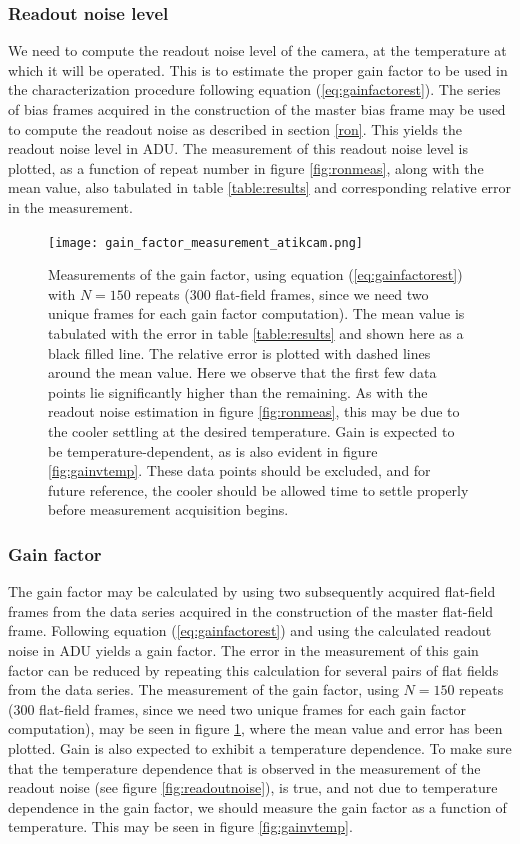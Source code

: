\documentclass[../main.tex]{subfiles}
\begin{document}
		\subsubsection{Readout noise level}
		We need to compute the readout noise level of the camera, at the temperature at which it will be operated. This is to estimate the proper gain factor to be used in the characterization procedure following equation (\ref{eq:gainfactorest}). The series of bias frames acquired in the construction of the master bias frame may be used to compute the readout noise as described in section \ref{ron}. This yields the readout noise level in ADU. The measurement of this readout noise level is plotted, as a function of repeat number in figure \ref{fig:ronmeas}, along with the mean value, also tabulated in table \ref{table:results} and corresponding relative error in the measurement.
		\begin{figure}[h!]
			\centering
			\texttt{[image: gain\_factor\_measurement\_atikcam.png]}
			\caption{Measurements of the gain factor, using equation (\ref{eq:gainfactorest}) with $N=150$ repeats ($300$ flat-field frames, since we need two unique frames for each gain factor computation). The mean value is tabulated with the error in table \ref{table:results} and shown here as a black filled line. The relative error is plotted with dashed lines around the mean value. Here we observe that the first few data points lie significantly higher than the remaining. As with the readout noise estimation in figure \ref{fig:ronmeas}, this may be due to the cooler settling at the desired temperature. Gain is expected to be temperature-dependent, as is also evident in figure \ref{fig:gainvtemp}. These data points should be excluded, and for future reference, the cooler should be allowed time to settle properly before measurement acquisition begins.} 
			\label{fig:gainmeasurement}
		\end{figure}
		
		\subsubsection{Gain factor}
		The gain factor may be calculated by using two subsequently acquired flat-field frames from the data series acquired in the construction of the master flat-field frame. Following equation (\ref{eq:gainfactorest}) and using the calculated readout noise in ADU yields a gain factor. The error in the measurement of this gain factor can be reduced by repeating this calculation for several pairs of flat fields from the data series. The measurement of the gain factor, using $N = 150$ repeats ($300$ flat-field frames, since we need two unique frames for each gain factor computation), may be seen in figure \ref{fig:gainmeasurement}, where the mean value and error has been plotted. Gain is also expected to exhibit a temperature dependence. To make sure that the temperature dependence that is observed in the measurement of the readout noise (see figure \ref{fig:readoutnoise}), is true, and not due to temperature dependence in the gain factor, we should measure the gain factor as a function of temperature. This may be seen in figure \ref{fig:gainvtemp}.
	
\end{document}
